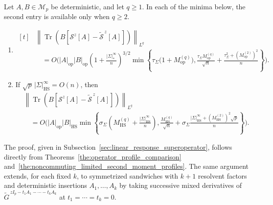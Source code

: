 \documentclass[EJP, preprint, NODS, nobera, nofontexpansion]{ejpecp}
\DeclareMathOperator{\op}{op}
\DeclareMathOperator{\tr}{Tr}
\DeclareMathOperator{\hs}{HS}
\begin{document}
\begin{corollary}
\label{cor:resolvent_sandwich_comparison}
Let $A,B\in\mathcal M_p$ be deterministic, and let $q\geq1$. In each of the
minima below, the second entry is available only when $q\geq2$.

\begin{enumerate}
\item[\textnormal{(i)}]
$\begin{aligned}[t]
&\left\|
    \tr\!\left(
        B\left[
            \mathcal S^z[A]
            -\widetilde{\mathcal S}^{\,z}[A]
        \right]
    \right)
\right\|_{L^q}
\nonumber\\
&\quad=
O\!\Biggl(
    |A|_{\op}|B|_{\op}
    \left(1+\frac{|\Sigma|_*^\infty}{n}\right)^{3/2}
    \min\left\{
        \tau_\Sigma\bigl(1+M_{\op}^{(q)}\bigr),
        \frac{\tau_\Sigma M_{\op}^{(q)}}{\sqrt n}
        +\frac{\tau_\Sigma^2+(M_{\op}^{(2)})^2}{n}
    \right\}
\Biggr).
\end{aligned}$

\item[\textnormal{(ii)}]
If $\sqrt p\,|\Sigma|_{\hs}^\infty=O(n)$,
then
\begin{align*}
&\left\|
    \tr\!\left(
        B\left[
            \mathcal S^z[A]
            -\widetilde{\mathcal S}^{\,z}[A]
        \right]
    \right)
\right\|_{L^q}
\nonumber\\
&\quad=
O\!\Biggl(
    |A|_{\op}|B|_{\hs}
    \min\left\{
        \sigma_\Sigma
        \left(
            M_{\hs}^{(q)}
            +\frac{|\Sigma|_{\hs}^\infty}{n}
        \right),
        \frac{M_{\hs}^{(q)}}{\sqrt n}
        +\sigma_\Sigma
        \frac{
            |\Sigma|_{\hs}^\infty
            +(M_{\hs}^{(2)})^2\sqrt p
        }{n}
    \right\}
\Biggr).
\end{align*}
\end{enumerate}
\end{corollary}

The proof, given in
Subsection~\ref{sec:linear_response_superoperator}, follows directly from
Theorems~\ref{the:operator_profile_comparison}
and~\ref{the:noncommuting_limited_second_moment_profiles}. The same argument
extends, for each fixed $k$, to symmetrized sandwiches with $k+1$ resolvent
factors and deterministic insertions $A_1,\ldots,A_k$ by taking successive
mixed derivatives of $\widetilde G^{\,zI_p-t_1A_1-\cdots-t_kA_k}$
at $t_1=\cdots=t_k=0$.
\end{document}
